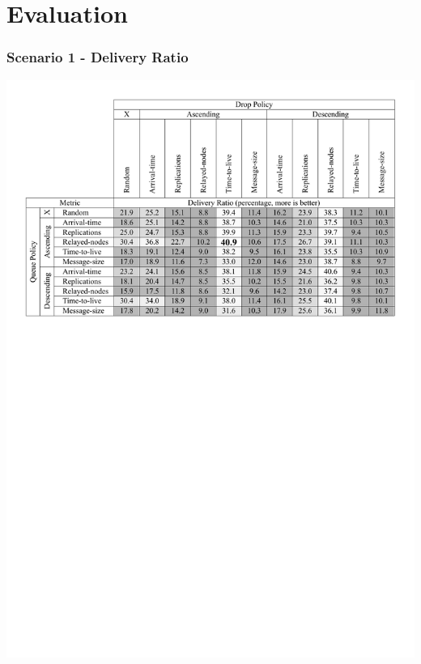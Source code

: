 \section{Evaluation}

\begin{frame}
  \frametitle{Scenario 1 - Delivery Ratio}
  \begin{center}
   \includegraphics[width=1.0\textwidth]{fig/tables/scenario1_part1.pdf}
  \end{center}
\end{frame}

